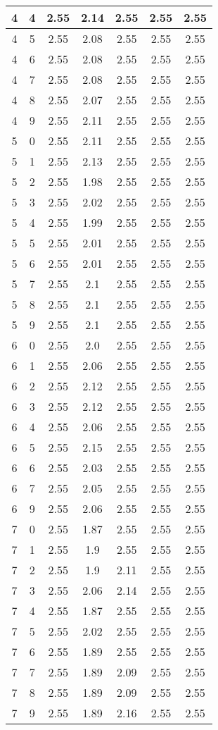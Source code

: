 \begin{longtable}{|c|c||c||c|c||c|c|}
	4 & 4 & 2.55 & 2.14 & 2.55 & 2.55 & 2.55 \\ \hline
	4 & 5 & 2.55 & 2.08 & 2.55 & 2.55 & 2.55 \\ \hline
	4 & 6 & 2.55 & 2.08 & 2.55 & 2.55 & 2.55 \\ \hline
	4 & 7 & 2.55 & 2.08 & 2.55 & 2.55 & 2.55 \\ \hline
	4 & 8 & 2.55 & 2.07 & 2.55 & 2.55 & 2.55 \\ \hline
	4 & 9 & 2.55 & 2.11 & 2.55 & 2.55 & 2.55 \\ \hline
	5 & 0 & 2.55 & 2.11 & 2.55 & 2.55 & 2.55 \\ \hline
	5 & 1 & 2.55 & 2.13 & 2.55 & 2.55 & 2.55 \\ \hline
	5 & 2 & 2.55 & 1.98 & 2.55 & 2.55 & 2.55 \\ \hline
	5 & 3 & 2.55 & 2.02 & 2.55 & 2.55 & 2.55 \\ \hline
	5 & 4 & 2.55 & 1.99 & 2.55 & 2.55 & 2.55 \\ \hline
	5 & 5 & 2.55 & 2.01 & 2.55 & 2.55 & 2.55 \\ \hline
	5 & 6 & 2.55 & 2.01 & 2.55 & 2.55 & 2.55 \\ \hline
	5 & 7 & 2.55 & 2.1 & 2.55 & 2.55 & 2.55 \\ \hline
	5 & 8 & 2.55 & 2.1 & 2.55 & 2.55 & 2.55 \\ \hline
	5 & 9 & 2.55 & 2.1 & 2.55 & 2.55 & 2.55 \\ \hline
	6 & 0 & 2.55 & 2.0 & 2.55 & 2.55 & 2.55 \\ \hline
	6 & 1 & 2.55 & 2.06 & 2.55 & 2.55 & 2.55 \\ \hline
	6 & 2 & 2.55 & 2.12 & 2.55 & 2.55 & 2.55 \\ \hline
	6 & 3 & 2.55 & 2.12 & 2.55 & 2.55 & 2.55 \\ \hline
	6 & 4 & 2.55 & 2.06 & 2.55 & 2.55 & 2.55 \\ \hline
	6 & 5 & 2.55 & 2.15 & 2.55 & 2.55 & 2.55 \\ \hline
	6 & 6 & 2.55 & 2.03 & 2.55 & 2.55 & 2.55 \\ \hline
	6 & 7 & 2.55 & 2.05 & 2.55 & 2.55 & 2.55 \\ \hline
	6 & 9 & 2.55 & 2.06 & 2.55 & 2.55 & 2.55 \\ \hline
	7 & 0 & 2.55 & 1.87 & 2.55 & 2.55 & 2.55 \\ \hline
	7 & 1 & 2.55 & 1.9 & 2.55 & 2.55 & 2.55 \\ \hline
	7 & 2 & 2.55 & 1.9 & 2.11 & 2.55 & 2.55 \\ \hline
	7 & 3 & 2.55 & 2.06 & 2.14 & 2.55 & 2.55 \\ \hline
	7 & 4 & 2.55 & 1.87 & 2.55 & 2.55 & 2.55 \\ \hline
	7 & 5 & 2.55 & 2.02 & 2.55 & 2.55 & 2.55 \\ \hline
	7 & 6 & 2.55 & 1.89 & 2.55 & 2.55 & 2.55 \\ \hline
	7 & 7 & 2.55 & 1.89 & 2.09 & 2.55 & 2.55 \\ \hline
	7 & 8 & 2.55 & 1.89 & 2.09 & 2.55 & 2.55 \\ \hline
	7 & 9 & 2.55 & 1.89 & 2.16 & 2.55 & 2.55 \\ \hline
\end{longtable}
